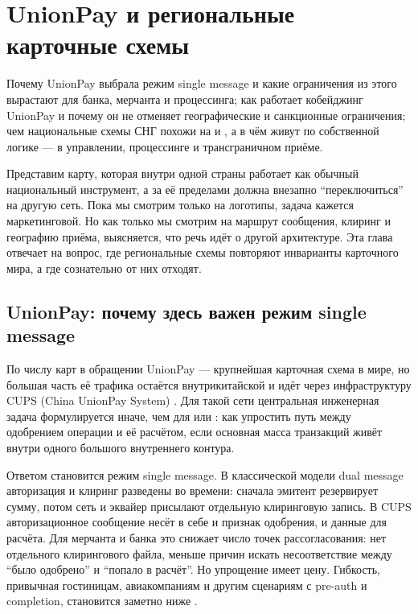 \chapter{UnionPay и региональные карточные схемы}
\label{ch:unionpay}
\margintoc


\begin{kaobox}[title=Что вы узнаете из этой главы]
  Почему UnionPay выбрала режим single message и какие ограничения
  из этого вырастают для банка, мерчанта и процессинга; как работает
  кобейджинг  \texttimes{} UnionPay и почему он не отменяет
  географические и санкционные ограничения; чем национальные схемы
  СНГ похожи на  и , а в чём живут
  по собственной логике — в управлении, процессинге и трансграничном
  приёме.
\end{kaobox}

Представим карту, которая внутри одной страны работает как обычный
национальный инструмент, а за её пределами должна внезапно
\enquote{переключиться} на другую сеть. Пока мы смотрим только
на логотипы, задача кажется маркетинговой. Но как только мы смотрим
на маршрут сообщения, клиринг и географию приёма, выясняется, что речь
идёт о другой архитектуре. Эта глава отвечает на вопрос, где
региональные схемы повторяют инварианты карточного мира, а где
сознательно от них отходят.

\section{UnionPay: почему здесь важен режим single message}
\label{sec:up-architecture}

По числу карт в обращении UnionPay — крупнейшая карточная схема
в мире, но большая часть её трафика остаётся внутрикитайской
и идёт через инфраструктуру CUPS (China UnionPay
System) . Для такой сети центральная инженерная задача формулируется
иначе, чем для  или : как упростить
путь между одобрением операции и её расчётом, если основная масса
транзакций живёт внутри одного большого внутреннего контура.

Ответом становится режим single message. В классической модели
dual message авторизация и клиринг разведены во времени: сначала
эмитент резервирует сумму, потом сеть и эквайер присылают отдельную
клиринговую запись. В CUPS авторизационное сообщение несёт
в себе и признак одобрения, и данные для расчёта. Для мерчанта
и банка это снижает число точек рассогласования: нет отдельного
клирингового файла, меньше причин искать несоответствие между
\enquote{было одобрено} и \enquote{попало в расчёт}. Но упрощение
имеет цену. Гибкость, привычная гостиницам, авиакомпаниям
и другим сценариям с pre-auth и completion, становится заметно
ниже .

